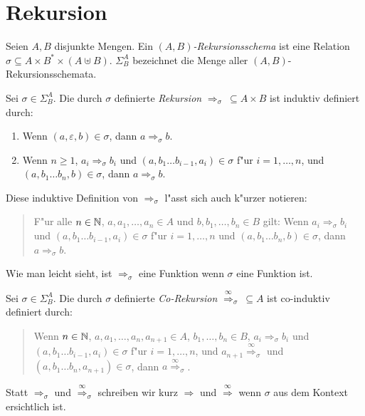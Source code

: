 \documentclass[12pt,a4paper]{article}
\begin{document}
\section{Rekursion}

\begin{definition}[Rekursionsschema]
  Seien $A,B$ disjunkte Mengen. Ein \emph{$(A,B)$-Rekursionsschema} ist eine Relation
  $\sigma \subseteq A \times B^* \times (A \uplus B)$. $\Sigma^A_B$ bezeichnet die Menge
  aller $(A,B)$-Rekursionsschemata.
\end{definition}

\begin{definition}[Rekursion]
  Sei $\sigma \in \Sigma^A_B$. Die durch $\sigma$ definierte \emph{Rekursion}
  $\Rightarrow_\sigma\ \subseteq A \times B$ ist induktiv definiert durch:
  \begin{enumerate}
  \item Wenn $(a,\varepsilon, b) \in \sigma$, dann $a \Rightarrow_\sigma b$.
  \item Wenn $n \ge 1$, $a_i \Rightarrow_\sigma b_i$ und $(a,b_1 \ldots b_{i-1},a_i) \in \sigma$ f"ur $i=1,\ldots,n$,
    und $(a,b_1 \ldots b_n,b)\in\sigma$, dann $a \Rightarrow_\sigma b$.
  \end{enumerate}
\end{definition}
Diese induktive Definition von $\Rightarrow_\sigma$ l"asst sich auch k"urzer notieren:
\begin{quote}
  F"ur alle $n \in \mathbb N$, $a, a_1,\ldots,a_n \in A$ und $b,b_1,\ldots,b_n\in B$ gilt: 
  Wenn $a_i \Rightarrow_\sigma b_i$ und $(a,b_1 \ldots b_{i-1},a_i)\in\sigma$ f"ur $i = 1,\ldots,n$ und
  $(a,b_1 \ldots b_n,b)\in\sigma$, dann $a \Rightarrow_\sigma b$.
\end{quote}
Wie man leicht sieht, ist $\Rightarrow_\sigma$ eine Funktion wenn $\sigma$ eine Funktion ist.

\begin{definition}[Co-Rekursion]
  Sei $\sigma \in \Sigma^A_B$. Die durch $\sigma$ definierte \emph{Co-Rekursion}
  $\stackrel{\infty}{\Rightarrow}_\sigma\ \subseteq A$ ist co-induktiv definiert durch:
  \begin{quote}
    Wenn $n \in \mathbb N$, $a, a_1,\ldots,a_n,a_{n+1} \in A$, $b_1,\ldots,b_n\in B$,
    $a_i \Rightarrow_\sigma b_i$ und $(a,b_1 \ldots b_{i-1},a_i)\in\sigma$ f"ur $i=1,\ldots,n$,
    und $a_{n+1} \stackrel{\infty}{\Rightarrow}_\sigma$ und $(a,b_1 \ldots b_n,a_{n+1})\in\sigma$,
    dann $a \stackrel{\infty}{\Rightarrow}_\sigma$.
  \end{quote}
\end{definition}
Statt $\Rightarrow_\sigma$ und $\stackrel{\infty}{\Rightarrow}_\sigma$ schreiben wir kurz $\Rightarrow$
und $\stackrel{\infty}{\Rightarrow}$ wenn $\sigma$ aus dem Kontext ersichtlich ist.
\end{document}
